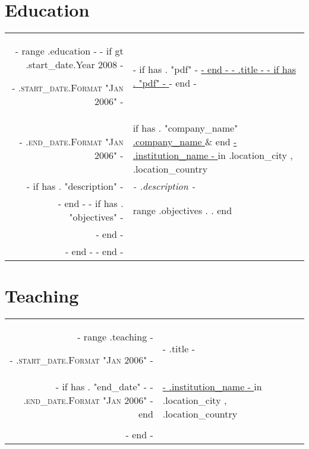 \section{Education}
\begin{tabular}{r|p{15cm}}
    {{- range .education -}}
    {{- if gt .start_date.Year 2008 -}}

    \textsc{ {{- .start_date.Format "Jan 2006" -}} } & {{- if has . "pdf" -}} \href{ {{- .pdf -}} }{ {{- end -}} {{- .title -}} {{- if has . "pdf" -}} } {{- end -}}                                                                                                     \\
    \textsc{ {{- .end_date.Format "Jan 2006" -}} }   & {{ if has . "company_name" }} \href{ {{- .company_url -}} } { {{ .company_name }} } \& {{ end }} \href{ {{- .institution_url -}} } { {{- .institution_name -}} } in {{ .location_city }}, {{ .location_country }} \\
    {{- if has . "description" -}}                   & \emph{ {{- .description -}} }                                                                                                                                                                                     \\ {{- end -}}
    {{- if has . "objectives" -}}                    & \footnotesize{ {{ range .objectives }} {{ . }}. {{ end }} }                                                                                                                                                       \\ {{- end -}}
    \multicolumn{2}{c}{}                                                                                                                                                                                                                                                 \\

    {{- end -}}
    {{- end -}}
\end{tabular}

\section{Teaching}
\begin{tabular}{r|p{15cm}}
    {{- range .teaching -}}

    \textsc{ {{- .start_date.Format "Jan 2006" -}} }                                    & {{- .title -}}                                                                                                  \\
    {{- if has . "end_date" -}}\textsc{ {{- .end_date.Format "Jan 2006" -}} } {{ end }} & \href{ {{- .institution_url -}} }{ {{- .institution_name -}} } in {{ .location_city }}, {{ .location_country }} \\
    \multicolumn{2}{c}{}                                                                                                                                                                                  \\

    {{- end -}}
\end{tabular}

